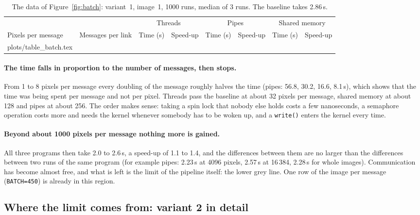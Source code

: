 \documentclass[11pt,a4paper]{article}
\makeatletter
\newcommand{\rows}[1]{\@@input plots/#1.tex }
\makeatother
\begin{document}
\begin{table}[H]
\centering\small
\setlength{\tabcolsep}{5pt}
\begin{tabular}{@{}lr rr rr rr@{}}
\toprule
& & \multicolumn{2}{c}{Threads} & \multicolumn{2}{c}{Pipes} & \multicolumn{2}{c}{Shared memory} \\
\cmidrule(lr){3-4}\cmidrule(lr){5-6}\cmidrule(l){7-8}
Pixels per message & Messages per link & Time (s) & Speed-up & Time (s) & Speed-up & Time (s) & Speed-up \\
\midrule
\rows{table_batch}
\bottomrule
\end{tabular}
\caption{The data of Figure~\ref{fig:batch}: variant~1, image~1, 1000 runs, median of 3 runs.
The baseline takes 2.86\,s.}
\label{tab:batch}
\end{table}

\paragraph{The time falls in proportion to the number of messages, then stops.} From 1 to 8 pixels
per message every doubling of the message roughly halves the time (pipes: 56.8, 30.2, 16.6,
8.1\,s), which shows that the time was being spent per message and not per pixel. Threads pass the
baseline at about 32 pixels per message, shared memory at about 128 and pipes at about 256. The
order makes sense: taking a spin lock that nobody else holds costs a few nanoseconds, a semaphore
operation costs more and needs the kernel whenever somebody has to be woken up, and a
\texttt{write()} enters the kernel every time.

\paragraph{Beyond about 1000 pixels per message nothing more is gained.} All three programs then
take 2.0 to 2.6\,s, a speed-up of 1.1 to 1.4, and the differences between them are no larger than
the differences between two runs of the same program (for example pipes: 2.23\,s at 4096 pixels,
2.57\,s at 16\,384, 2.28\,s for whole images). Communication has become almost free, and what is
left is the limit of the pipeline itself: the lower grey line. One row of the image per message
(\texttt{BATCH=450}) is already in this region.

\subsection{Where the limit comes from: variant 2 in detail}
\end{document}
